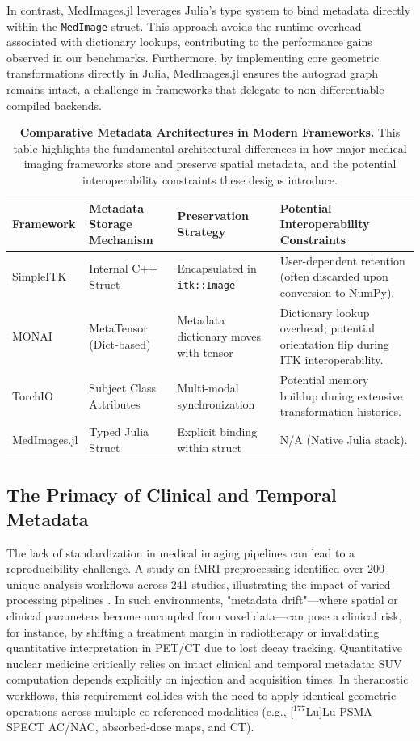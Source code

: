 \documentclass[10pt,letterpaper]{article}
\begin{document}
In contrast, MedImages.jl leverages Julia's type system to bind metadata directly within the \texttt{MedImage} struct. This approach avoids the runtime overhead associated with dictionary lookups, contributing to the performance gains observed in our benchmarks. Furthermore, by implementing core geometric transformations directly in Julia, MedImages.jl ensures the autograd graph remains intact, a challenge in frameworks that delegate to non-differentiable compiled backends.

\begin{table}[H]
\centering
\caption{\textbf{Comparative Metadata Architectures in Modern Frameworks.} This table highlights the fundamental architectural differences in how major medical imaging frameworks store and preserve spatial metadata, and the potential interoperability constraints these designs introduce.}
\begin{tabular}{|p{2.5cm}|p{3.5cm}|p{3.5cm}|p{3.5cm}|}
\hline
\textbf{Framework} & \textbf{Metadata Storage Mechanism} & \textbf{Preservation Strategy} & \textbf{Potential Interoperability Constraints} \\
\hline
SimpleITK & Internal C++ Struct & Encapsulated in \texttt{itk::Image} & User-dependent retention (often discarded upon conversion to NumPy). \\
\hline
MONAI & MetaTensor (Dict-based) & Metadata dictionary moves with tensor & Dictionary lookup overhead; potential orientation flip during ITK interoperability. \\
\hline
TorchIO & Subject Class Attributes & Multi-modal synchronization & Potential memory buildup during extensive transformation histories. \\
\hline
MedImages.jl & Typed Julia Struct & Explicit binding within struct & N/A (Native Julia stack). \\
\hline
\end{tabular}
\label{tab:metadata_comparison}
\end{table}

\subsection{The Primacy of Clinical and Temporal Metadata}
The lack of standardization in medical imaging pipelines can lead to a reproducibility challenge. A study on fMRI preprocessing identified over 200 unique analysis workflows across 241 studies, illustrating the impact of varied processing pipelines \cite{Esteban_2018}. In such environments, "metadata drift"---where spatial or clinical parameters become uncoupled from voxel data---can pose a clinical risk, for instance, by shifting a treatment margin in radiotherapy or invalidating quantitative interpretation in PET/CT due to lost decay tracking.
Quantitative nuclear medicine critically relies on intact clinical and temporal metadata: SUV computation depends explicitly on injection and acquisition times. In theranostic workflows, this requirement collides with the need to apply identical geometric operations across multiple co-referenced modalities (e.g., [$^{177}$Lu]Lu-PSMA SPECT AC/NAC, absorbed-dose maps, and CT).
\end{document}
